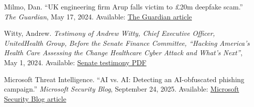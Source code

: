 \documentclass[11pt]{article}
\begin{document}
\begin{enumerate}[leftmargin=1.5em,label={[}\arabic*{]}]
    \item Milmo, Dan. ``UK engineering firm Arup falls victim to \pounds 20m deepfake scam.''
    \textit{The Guardian}, May 17, 2024.
    Available: \href{https://www.theguardian.com/technology/article/2024/may/17/uk-engineering-arup-deepfake-scam-hong-kong-ai-video}{The Guardian article}

    \item Witty, Andrew.
    \textit{Testimony of Andrew Witty, Chief Executive Officer, UnitedHealth Group, Before the Senate Finance Committee, ``Hacking America’s Health Care Assessing the Change Healthcare Cyber Attack and What’s Next''},
    May 1, 2024.
    Available: \href{https://www.finance.senate.gov/imo/media/doc/0501_witty_testimony.pdf}{Senate testimony PDF}

    \item Microsoft Threat Intelligence. ``AI vs. AI: Detecting an AI-obfuscated phishing campaign.''
    \textit{Microsoft Security Blog}, September 24, 2025.
    Available: \href{https://www.microsoft.com/en-us/security/blog/2025/09/24/ai-vs-ai-detecting-an-ai-obfuscated-phishing-campaign/}{Microsoft Security Blog article}
\end{enumerate}
\end{document}

